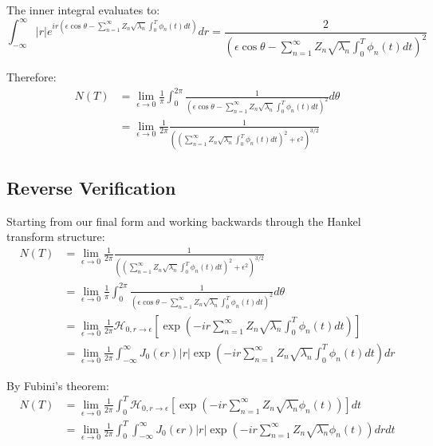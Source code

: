 \documentclass{article}
\begin{document}
The inner integral evaluates to:
\begin{equation}
    \int_{-\infty}^{\infty} |r| e^{ir(\epsilon\cos\theta - \sum_{n=1}^{\infty} Z_n \sqrt{\lambda_n} \int_0^T \phi_n(t) dt)} dr = \frac{2}{(\epsilon\cos\theta - \sum_{n=1}^{\infty} Z_n \sqrt{\lambda_n} \int_0^T \phi_n(t) dt)^2}
\end{equation}

Therefore:
\begin{equation}
\begin{split}
    N(T) &= \lim_{\epsilon \to 0} \frac{1}{\pi} \int_0^{2\pi} \frac{1}{(\epsilon\cos\theta - \sum_{n=1}^{\infty} Z_n \sqrt{\lambda_n} \int_0^T \phi_n(t) dt)^2} d\theta \\
    &= \lim_{\epsilon \to 0} \frac{1}{2\pi} \frac{1}{((\sum_{n=1}^{\infty} Z_n \sqrt{\lambda_n} \int_0^T \phi_n(t) dt)^2 + \epsilon^2)^{3/2}}
\end{split}
\end{equation}

\subsection{Reverse Verification}
Starting from our final form and working backwards through the Hankel transform structure:
\begin{equation}
\begin{split}
    N(T) &= \lim_{\epsilon \to 0} \frac{1}{2\pi} \frac{1}{((\sum_{n=1}^{\infty} Z_n \sqrt{\lambda_n} \int_0^T \phi_n(t) dt)^2 + \epsilon^2)^{3/2}} \\
    &= \lim_{\epsilon \to 0} \frac{1}{\pi} \int_0^{2\pi} \frac{1}{(\epsilon\cos\theta - \sum_{n=1}^{\infty} Z_n \sqrt{\lambda_n} \int_0^T \phi_n(t) dt)^2} d\theta \\
    &= \lim_{\epsilon \to 0} \frac{1}{2\pi} \mathcal{H}_{0,r\to\epsilon}\left[\exp\left(-ir\sum_{n=1}^{\infty} Z_n \sqrt{\lambda_n} \int_0^T \phi_n(t) dt\right)\right] \\
    &= \lim_{\epsilon \to 0} \frac{1}{2\pi} \int_{-\infty}^{\infty} J_0(\epsilon r)|r| \exp\left(-ir\sum_{n=1}^{\infty} Z_n \sqrt{\lambda_n} \int_0^T \phi_n(t) dt\right) dr
\end{split}
\end{equation}

By Fubini's theorem:
\begin{equation}
\begin{split}
    N(T) &= \lim_{\epsilon \to 0} \frac{1}{2\pi} \int_0^T \mathcal{H}_{0,r\to\epsilon}\left[\exp\left(-ir\sum_{n=1}^{\infty} Z_n \sqrt{\lambda_n} \phi_n(t)\right)\right] dt \\
    &= \lim_{\epsilon \to 0} \frac{1}{2\pi} \int_0^T \int_{-\infty}^{\infty} J_0(\epsilon r)|r| \exp\left(-ir\sum_{n=1}^{\infty} Z_n \sqrt{\lambda_n} \phi_n(t)\right) dr dt
\end{split}
\end{equation}
\end{document}
